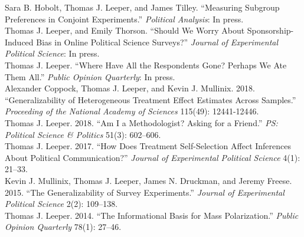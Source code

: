 \documentclass[12pt]{article}
\newcommand{\entry}[1]{\indent {\color{lg}\guillemotright}\hspace{2pt}#1\vspace{.25em}\\}
\begin{document}
	\entry{Sara B. Hobolt, Thomas J. Leeper, and James Tilley. ``Measuring Subgroup Preferences in Conjoint Experiments.'' \textit{Political Analysis}: In press.}
	\entry{Thomas J. Leeper, and Emily Thorson. ``Should We Worry About Sponsorship-Induced Bias in Online Political Science Surveys?'' \textit{Journal of Experimental Political Science}: In press.}
	\entry{Thomas J. Leeper. ``Where Have All the Respondents Gone? Perhaps We Ate Them All.'' \textit{Public Opinion Quarterly}: In press.}
	\entry{Alexander Coppock, Thomas J. Leeper, and Kevin J. Mullinix. 2018. ``Generalizability of Heterogeneous Treatment Effect Estimates Across Samples.'' \textit{Proceeding of the National Academy of Sciences} 115(49): 12441-12446.}
	\entry{Thomas J. Leeper. 2018. ``Am I a Methodologist? Asking for a Friend.'' \textit{PS: Political Science \& Politics} 51(3): 602--606.}
    \entry{Thomas J. Leeper. 2017. ``How Does Treatment Self-Selection Affect Inferences About Political Communication?'' \textit{Journal of Experimental Political Science} 4(1): 21--33.}	
	\entry{Kevin J. Mullinix, Thomas J. Leeper, James N. Druckman, and Jeremy Freese. 2015. ``The Generalizability of Survey Experiments.'' {\em Journal of Experimental Political Science} 2(2): 109--138.}
	\entry{Thomas J. Leeper. 2014. ``The Informational Basis for Mass Polarization.'' {\em Public Opinion Quarterly} 78(1): 27--46.}
\end{document}
